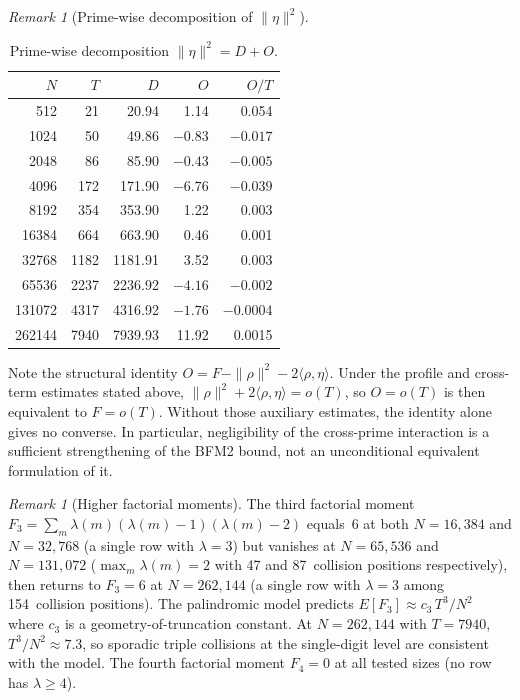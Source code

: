 \documentclass[11pt]{article}
\theoremstyle{definition}
\theoremstyle{remark}
\newtheorem{remark}[theorem]{Remark}
\begin{document}
\begin{remark}[Prime-wise decomposition of $\|\eta\|^2$]
\begin{table}[ht]
\centering\small
\caption{Prime-wise decomposition
$\|\eta\|^2 = D + O$.}
\label{tab:prime-decomp}
\begin{tabular}{rrrrr}
\toprule
$N$ & $T$ & $D$ & $O$ & $O/T$ \\
\midrule
512 & 21 & 20.94 & 1.14 & 0.054 \\
1024 & 50 & 49.86 & $-0.83$ & $-0.017$ \\
2048 & 86 & 85.90 & $-0.43$ & $-0.005$ \\
4096 & 172 & 171.90 & $-6.76$ & $-0.039$ \\
8192 & 354 & 353.90 & 1.22 & 0.003 \\
16384 & 664 & 663.90 & 0.46 & 0.001 \\
32768 & 1182 & 1181.91 & 3.52 & 0.003 \\
65536 & 2237 & 2236.92 & $-4.16$ & $-0.002$ \\
131072 & 4317 & 4316.92 & $-1.76$ & $-0.0004$ \\
262144 & 7940 & 7939.93 & 11.92 & 0.0015 \\
\bottomrule
\end{tabular}
\end{table}
Note the structural identity
$O = F - \|\rho\|^2 - 2\langle\rho,\eta\rangle$.
Under the profile and cross-term estimates stated above,
$\|\rho\|^2+2\langle\rho,\eta\rangle=o(T)$, so
$O=o(T)$ is then equivalent to $F=o(T)$.
Without those auxiliary estimates, the identity alone gives
no converse.  In particular, negligibility of the cross-prime
interaction is a sufficient strengthening of the BFM2 bound,
not an unconditional equivalent formulation of it.
\end{remark}

\begin{remark}[Higher factorial moments]
\label{rem:factorial-moments}
The third factorial moment
$F_3 = \sum_m \lambda(m)(\lambda(m){-}1)(\lambda(m){-}2)$
equals~$6$ at both $N = 16{,}384$ and $N = 32{,}768$
(a single row with $\lambda = 3$)
but vanishes at $N = 65{,}536$ and $N = 131{,}072$
($\max_m \lambda(m) = 2$ with
47 and 87~collision positions respectively),
then returns to $F_3 = 6$ at $N = 262{,}144$
(a single row with $\lambda = 3$
among 154~collision positions).
The palindromic model predicts
$E[F_3] \approx c_3\,T^3/N^2$
where $c_3$ is a geometry-of-truncation
constant.
At $N = 262{,}144$ with $T = 7940$,
$T^3/N^2 \approx 7.3$,
so sporadic triple collisions at
the single-digit level are consistent
with the model.
The fourth factorial moment
$F_4 = 0$ at all tested sizes
(no row has $\lambda \ge 4$).
\end{remark}
\end{document}
